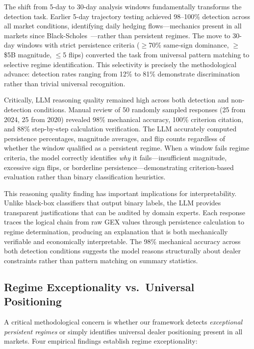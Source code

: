 The shift from 5-day to 30-day analysis windows fundamentally transforms the detection task. Earlier 5-day trajectory testing achieved 98--100\% detection across all market conditions, identifying daily hedging flows---mechanics present in all markets since Black-Scholes~\cite{black1973pricing}---rather than persistent regimes. The move to 30-day windows with strict persistence criteria ($\geq$70\% same-sign dominance, $\geq$\$5B magnitude, $\leq$5 flips) converted the task from universal pattern matching to selective regime identification. This selectivity is precisely the methodological advance: detection rates ranging from 12\% to 81\% demonstrate discrimination rather than trivial universal recognition.

Critically, LLM reasoning quality remained high across both detection and non-detection conditions. Manual review of 50 randomly sampled responses (25 from 2024, 25 from 2020) revealed 98\% mechanical accuracy, 100\% criterion citation, and 88\% step-by-step calculation verification. The LLM accurately computed persistence percentages, magnitude averages, and flip counts regardless of whether the window qualified as a persistent regime. When a window fails regime criteria, the model correctly identifies \textit{why} it fails---insufficient magnitude, excessive sign flips, or borderline persistence---demonstrating criterion-based evaluation rather than binary classification heuristics.

This reasoning quality finding has important implications for interpretability. Unlike black-box classifiers that output binary labels, the LLM provides transparent justifications that can be audited by domain experts. Each response traces the logical chain from raw GEX values through persistence calculation to regime determination, producing an explanation that is both mechanically verifiable and economically interpretable. The 98\% mechanical accuracy across both detection conditions suggests the model reasons structurally about dealer constraints rather than pattern matching on summary statistics.

\subsection{Regime Exceptionality vs.\ Universal Positioning}

A critical methodological concern is whether our framework detects \textit{exceptional persistent regimes} or simply identifies universal dealer positioning present in all markets. Four empirical findings establish regime exceptionality:

